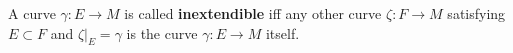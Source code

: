 A curve $\gamma: E \rightarrow M$ is called \textbf{inextendible} iff any other curve $\zeta: F \rightarrow M$ satisfying $E \subset F$ and $\zeta|_E = \gamma$ is the curve $\gamma: E \rightarrow M$ itself.
